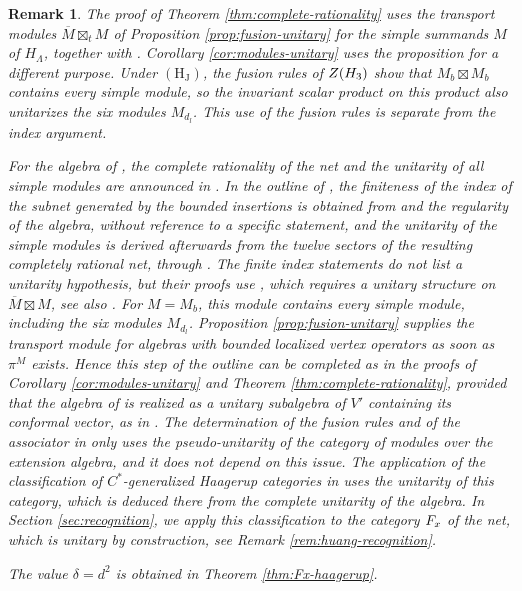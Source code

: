 \documentclass[leqno]{article}
\let\cal\relax
\newcommand{\cal}{\mathcal}
\newcommand{\ovl}{\overline}
\newtheorem{remark}[thm]{Remark}
\numberwithin{equation}{section}
\begin{document}
\begin{remark}\normalfont
\label{rem:delta}
The proof of Theorem \ref{thm:complete-rationality} uses the transport modules $\ovl M\boxtimes_t M$ of Proposition \ref{prop:fusion-unitary} for the simple summands $M$ of $H_\Lambda$, together with \cite[Theorem 4.19]{Ten24}. Corollary \ref{cor:modules-unitary} uses the proposition for a different purpose. Under $\mathrm{(H_J)}$, the fusion rules of $Z(\cal H_3)$ show that $M_b\boxtimes M_b$ contains every simple module, so the invariant scalar product on this product also unitarizes the six modules $M_{d_l}$. This use of the fusion rules is separate from the index argument.

For the algebra of \cite{Hua26}, the complete rationality of the net and the unitarity of all simple modules are announced in \cite[Theorem 1 p.~1 and Section 6 pp.~8--9]{Hua26}. In the outline of \cite[Section 6 p.~8]{Hua26}, the finiteness of the index of the subnet generated by the bounded insertions is obtained from \cite{Ten24} and the regularity of the algebra, without reference to a specific statement, and the unitarity of the simple modules is derived afterwards from the twelve sectors of the resulting completely rational net, through \cite[Theorem 9.5 and Remark 9.8]{HeT25}. The finite index statements \cite[Theorem B and Corollary C p.~6, Theorem 4.20 p.~55 and Corollaries 4.21 and 4.24 pp.~55--56]{Ten24} do not list a unitarity hypothesis, but their proofs use \cite[Corollary 4.5 p.~44]{Ten24}, which requires a unitary structure on $\ovl M \boxtimes M$, see also \cite[Remark 3.18 p.~37]{Ten24}. For $M = M_b$, this module contains every simple module, including the six modules $M_{d_l}$. Proposition \ref{prop:fusion-unitary} supplies the transport module for algebras with bounded localized vertex operators as soon as $\pi^M$ exists. Hence this step of the outline can be completed as in the proofs of Corollary \ref{cor:modules-unitary} and Theorem \ref{thm:complete-rationality}, provided that the algebra of \cite{Hua26} is realized as a unitary subalgebra of $V'$ containing its conformal vector, as in \cite[Remark 7.14]{ArhIII}. The determination of the fusion rules and of the associator in \cite[Section 5 pp.~6--8]{Hua26} only uses the pseudo-unitarity of the category of modules over the extension algebra, and it does not depend on this issue. The application of the classification of $C^*$-generalized Haagerup categories \cite[Theorem 5.9 p.~36]{Izu18} in \cite[Section 6 p.~9]{Hua26} uses the unitarity of this category, which is deduced there from the complete unitarity of the algebra. In Section \ref{sec:recognition}, we apply this classification to the category $\cal F_x$ of the net, which is unitary by construction, see Remark \ref{rem:huang-recognition}.

The value $\delta = d^2$ is obtained in Theorem \ref{thm:Fx-haagerup}.
\end{remark}
\end{document}
